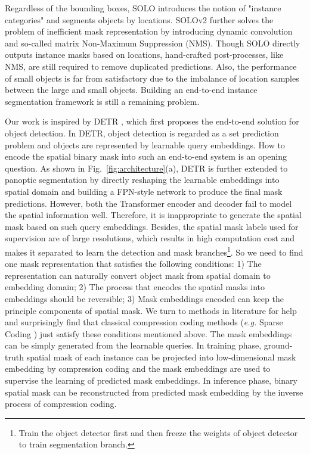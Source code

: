 \documentclass{article}
\begin{document}
Regardless of the bounding boxes, SOLO \cite{wang2020solo} introduces the notion of "instance categories" and segments objects by locations. SOLOv2 \cite{wang2020solov2} further solves the problem of inefficient mask representation by introducing dynamic convolution and so-called matrix Non-Maximum Suppression (NMS). Though SOLO directly outputs instance masks based on locations, hand-crafted post-processes, like NMS, are still required to remove duplicated predictions. Also, the performance of small objects is far from satisfactory due to the imbalance of location samples between the large and small objects. Building an end-to-end instance segmentation framework is still a remaining problem.

Our work is inspired by DETR \cite{carion2020detr}, which first proposes the end-to-end solution for object detection. In DETR, object detection is regarded as a set prediction problem and objects are represented by learnable query embeddings. How to encode the spatial binary mask into such an end-to-end system is an opening question. As shown in Fig.~\ref{fig:architecture}(a), DETR is further extended to panoptic segmentation by directly reshaping the learnable embeddings into spatial domain and building a FPN-style \cite{lin2017feature} network to produce the final mask predictions. However, both the Transformer encoder and decoder fail to model the spatial information well. Therefore, it is inappropriate to generate the spatial mask based on such query embeddings. Besides, the spatial mask labels used for supervision are of large resolutions, which results in high computation cost and makes it separated to learn the detection and mask branches\footnote{Train the object detector first and then freeze the weights of object detector to train segmentation branch.}. So we need to find one mask representation that satisfies the following conditions: 1) The representation can naturally convert object mask from spatial domain to embedding domain; 2) The process that encodes the spatial masks into embeddings should be reversible; 3) Mask embeddings encoded can keep the principle components of spatial mask. We turn to methods in literature for help and surprisingly find that classical compression coding methods (\textit{e.g.} Sparse Coding \cite{tao2014sparse}) just satisfy these conditions mentioned above. The mask embeddings can be simply generated from the learnable queries. In training phase, ground-truth spatial mask of each instance can be projected into low-dimensional mask embedding by compression coding and the mask embeddings are used to supervise the learning of predicted mask embeddings. In inference phase, binary spatial mask can be reconstructed from predicted mask embedding by the inverse process of compression coding. 
\end{document}
